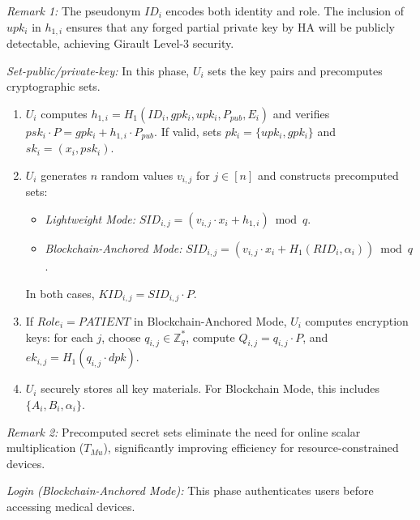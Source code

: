 \documentclass[conference]{IEEEtran}
\begin{document}
\textit{Remark 1:} The pseudonym $ID_i$ encodes both identity and role. The inclusion of $upk_i$ in $h_{1,i}$ ensures that any forged partial private key by HA will be publicly detectable, achieving Girault Level-3 security.

\vspace{0.5em}

\noindent\textit{Set-public/private-key:} In this phase, $U_i$ sets the key pairs and precomputes cryptographic sets.

\begin{enumerate}
\item $U_i$ computes $h_{1,i} = H_1(ID_i, gpk_i, upk_i, P_{pub}, E_i)$ and verifies $psk_i \cdot P = gpk_i + h_{1,i} \cdot P_{pub}$. If valid, sets $pk_i = \{upk_i, gpk_i\}$ and $sk_i = (x_i, psk_i)$.

\item $U_i$ generates $n$ random values $v_{i,j}$ for $j \in [n]$ and constructs precomputed sets:

\begin{itemize}
\item \textit{Lightweight Mode:} $SID_{i,j} = (v_{i,j} \cdot x_i + h_{1,i}) \bmod q$.

\item \textit{Blockchain-Anchored Mode:} $SID_{i,j} = (v_{i,j} \cdot x_i + H_1(RID_i, \alpha_i)) \bmod q$.
\end{itemize}

In both cases, $KID_{i,j} = SID_{i,j} \cdot P$.

\item If $Role_i = PATIENT$ in Blockchain-Anchored Mode, $U_i$ computes encryption keys: for each $j$, choose $q_{i,j} \in \mathbb{Z}_q^*$, compute $Q_{i,j} = q_{i,j} \cdot P$, and $ek_{i,j} = H_1(q_{i,j} \cdot dpk)$.

\item $U_i$ securely stores all key materials. For Blockchain Mode, this includes $\{A_i, B_i, \alpha_i\}$.
\end{enumerate}

\textit{Remark 2:} Precomputed secret sets eliminate the need for online scalar multiplication ($T_{Mu}$), significantly improving efficiency for resource-constrained devices.

\vspace{0.5em}

\noindent\textit{Login (Blockchain-Anchored Mode):} This phase authenticates users before accessing medical devices.
\end{document}
